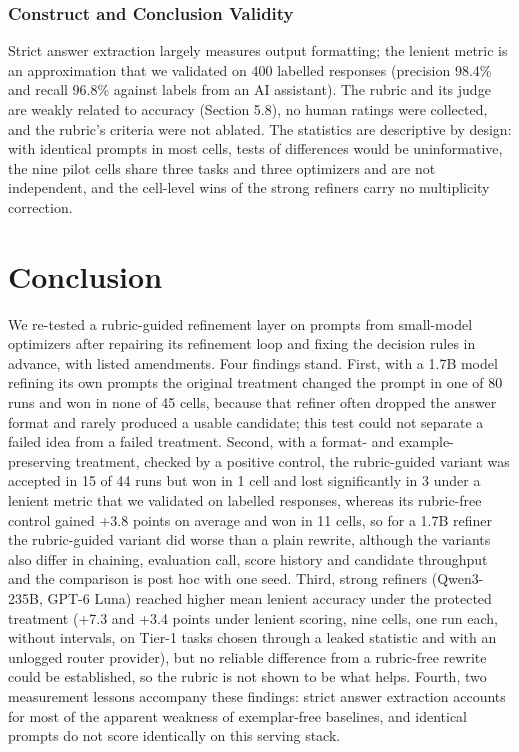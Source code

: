 \documentclass{ieeeaccess}
\begin{document}
\subsubsection{Construct and Conclusion Validity}

Strict answer extraction largely measures output formatting; the lenient metric is an approximation that we validated on 400 labelled responses (precision 98.4\% and recall 96.8\% against labels from an AI assistant). The rubric and its judge are weakly related to accuracy (Section 5.8), no human ratings were collected, and the rubric's criteria were not ablated. The statistics are descriptive by design: with identical prompts in most cells, tests of differences would be uninformative, the nine pilot cells share three tasks and three optimizers and are not independent, and the cell-level wins of the strong refiners carry no multiplicity correction.

\section{Conclusion}

We re-tested a rubric-guided refinement layer on prompts from small-model optimizers after repairing its refinement loop and fixing the decision rules in advance, with listed amendments. Four findings stand. First, with a 1.7B model refining its own prompts the original treatment changed the prompt in one of 80 runs and won in none of 45 cells, because that refiner often dropped the answer format and rarely produced a usable candidate; this test could not separate a failed idea from a failed treatment. Second, with a format- and example-preserving treatment, checked by a positive control, the rubric-guided variant was accepted in 15 of 44 runs but won in 1 cell and lost significantly in 3 under a lenient metric that we validated on labelled responses, whereas its rubric-free control gained +3.8 points on average and won in 11 cells, so for a 1.7B refiner the rubric-guided variant did worse than a plain rewrite, although the variants also differ in chaining, evaluation call, score history and candidate throughput and the comparison is post hoc with one seed. Third, strong refiners (Qwen3-235B, GPT-6 Luna) reached higher mean lenient accuracy under the protected treatment (+7.3 and +3.4 points under lenient scoring, nine cells, one run each, without intervals, on Tier-1 tasks chosen through a leaked statistic and with an unlogged router provider), but no reliable difference from a rubric-free rewrite could be established, so the rubric is not shown to be what helps. Fourth, two measurement lessons accompany these findings: strict answer extraction accounts for most of the apparent weakness of exemplar-free baselines, and identical prompts do not score identically on this serving stack.
\end{document}
